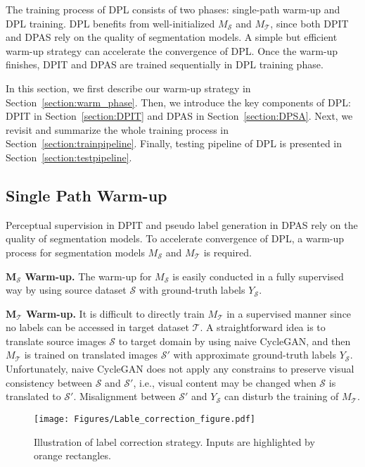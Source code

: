 \documentclass[10pt,twocolumn,letterpaper]{article}
\begin{document}
The training process of DPL consists of two phases: single-path warm-up and DPL training. DPL benefits from well-initialized $M_{\mathcal{S}}$ and $M_{\mathcal{T}}$, since both DPIT and DPAS rely on the quality of segmentation models. A simple but efficient warm-up strategy can accelerate the convergence of DPL. Once the warm-up finishes, DPIT and DPAS are trained sequentially in DPL training phase. 

In this section, we first describe our warm-up strategy in Section~\ref{section:warm_phase}. Then, we introduce the key components of DPL: DPIT in Section~\ref{section:DPIT} and DPAS in Section~\ref{section:DPSA}. Next, we revisit and summarize the whole training process in Section~\ref{section:trainpipeline}. Finally, testing pipeline of DPL is presented in Section~\ref{section:testpipeline}.

\subsection{Single Path Warm-up\label{section:warm_phase}}
Perceptual supervision in DPIT and pseudo label generation in DPAS rely on the quality of segmentation models. To accelerate convergence of DPL, a warm-up process for segmentation models $M_{\mathcal{S}}$ and $M_{\mathcal{T}}$ is required. 

\noindent\textbf{$\boldsymbol{M_{\mathcal{S}}}$ Warm-up.} 
The warm-up for ${M_{\mathcal{S}}}$ is easily conducted in a fully supervised way by using source dataset $\mathcal{S}$ with ground-truth labels $Y_\mathcal{S}$. 

\noindent\textbf{$\boldsymbol{M_{\mathcal{T}}}$ Warm-up.}
It is difficult to directly train $M_{\mathcal{T}}$ in a supervised manner since no labels can be accessed in target dataset $\mathcal{T}$. A straightforward idea is to translate source images $\mathcal{S}$ to target domain by using naive CycleGAN, and then $M_{\mathcal{T}}$ is trained on translated images $\mathcal{S}'$ with approximate ground-truth labels $Y_{\mathcal{S}}$. Unfortunately, naive CycleGAN does not apply any constrains to preserve visual consistency between $\mathcal{S}$ and $\mathcal{S'}$, i.e., visual content may be changed when $\mathcal{S}$ is translated to $\mathcal{S'}$. Misalignment between $\mathcal{S'}$ and $Y_{\mathcal{S}}$ can disturb the training of $M_{\mathcal{T}}$.

\begin{figure}[t]
	
    \centering 
  \texttt{[image: Figures/Lable\_correction\_figure.pdf]}
  
    \caption{Illustration of label correction strategy. Inputs are highlighted by orange rectangles.}

 \label{fig:initialazion_T}
 \setlength{\belowcaptionskip}{-2cm}
 \vspace{-0.7cm}
\end{figure}
\end{document}
